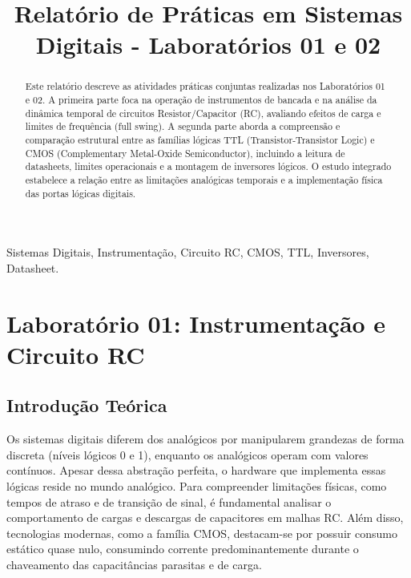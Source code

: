 \documentclass[conference]{IEEEtran}
\begin{document}
\title{Relatório de Práticas em Sistemas Digitais - Laboratórios 01 e 02}

\author{
}

\maketitle

\begin{abstract}
Este relatório descreve as atividades práticas conjuntas realizadas nos Laboratórios 01 e 02. A primeira parte foca na operação de instrumentos de bancada e na análise da dinâmica temporal de circuitos Resistor/Capacitor (RC), avaliando efeitos de carga e limites de frequência (full swing). A segunda parte aborda a compreensão e comparação estrutural entre as famílias lógicas TTL (Transistor-Transistor Logic) e CMOS (Complementary Metal-Oxide Semiconductor), incluindo a leitura de datasheets, limites operacionais e a montagem de inversores lógicos. O estudo integrado estabelece a relação entre as limitações analógicas temporais e a implementação física das portas lógicas digitais.
\end{abstract}

\begin{IEEEkeywords}
Sistemas Digitais, Instrumentação, Circuito RC, CMOS, TTL, Inversores, Datasheet.
\end{IEEEkeywords}

\section{Laboratório 01: Instrumentação e Circuito RC}

\subsection{Introdução Teórica}
Os sistemas digitais diferem dos analógicos por manipularem grandezas de forma discreta (níveis lógicos 0 e 1), enquanto os analógicos operam com valores contínuos. Apesar dessa abstração perfeita, o hardware que implementa essas lógicas reside no mundo analógico. Para compreender limitações físicas, como tempos de atraso e de transição de sinal, é fundamental analisar o comportamento de cargas e descargas de capacitores em malhas RC. Além disso, tecnologias modernas, como a família CMOS, destacam-se por possuir consumo estático quase nulo, consumindo corrente predominantemente durante o chaveamento das capacitâncias parasitas e de carga.
\end{document}
